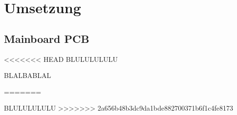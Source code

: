 \newpage
\section{Umsetzung}
\subsection{Mainboard PCB}

<<<<<<< HEAD
BLULULULULU

BLALBABLAL

=======

BLULULULULU
>>>>>>> 2a656b48b3dc9da1bde882700371b6f1c4fe8173
